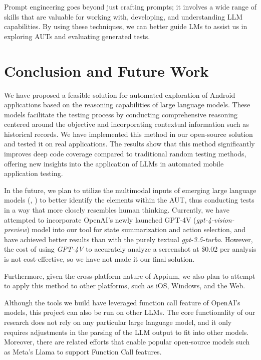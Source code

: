 \documentclass[conference]{IEEEtran}
\begin{document}
Prompt engineering goes beyond just crafting prompts; it involves a wide range of skills that are valuable for working with, developing, and understanding LLM capabilities. By using these techniques, we can better guide LMs to assist us in exploring AUTs and evaluating generated tests.\cite{li_mapping_2020}

\section{Conclusion and Future Work}

We have proposed a feasible solution for automated exploration of Android applications based on the reasoning capabilities of large language models. These models facilitate the testing process by conducting comprehensive reasoning centered around the objective and incorporating contextual information such as historical records. We have implemented this method in our open-source solution and tested it on real applications. The results show that this method significantly improves deep code coverage compared to traditional random testing methods, offering new insights into the application of LLMs in automated mobile application testing.

In the future, we plan to utilize the multimodal inputs of emerging large language models (\cite[GPT-4V]{openai_gpt-4v}, \cite[CogVLM]{cogvlm}) to better identify the elements within the AUT, thus conducting tests in a way that more closely resembles human thinking. Currently, we have attempted to incorporate OpenAI's newly launched GPT-4V (\textit{gpt-4-vision-preview}) model into our tool for state summarization and action selection, and have achieved better results than with the purely textual \textit{gpt-3.5-turbo}. However, the cost of using \textit{GPT-4V} to accurately analyze a screenshot at \$0.02 per analysis is not cost-effective, so we have not made it our final solution.

Furthermore, given the cross-platform nature of Appium, we also plan to attempt to apply this method to other platforms, such as iOS, Windows, and the Web.

Although the tools we build have leveraged function call feature\cite{function_call_annonucement} of OpenAI's models, this project can also be run on other LLMs. The core functionality of our research does not rely on any particular large language model, and it only requires adjustments in the parsing of the LLM output to fit into other models. Moreover, there are related efforts that enable popular open-source models such as Meta's Llama to support Function Call features.
\end{document}
